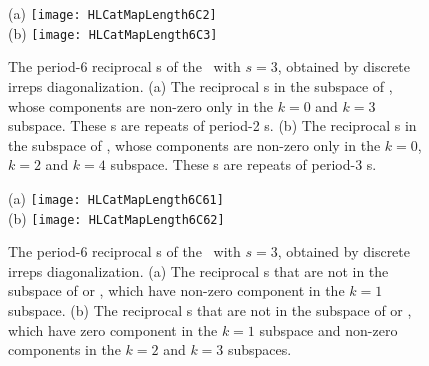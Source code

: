 \begin{description}
\begin{figure}
  \centering
{(a)} %
\texttt{[image: HLCatMapLength6C2]}
\\
{(b)} %
\texttt{[image: HLCatMapLength6C3]}
  \caption{\label{fig:HLCatMapLength6C2C3}
The period-6 reciprocal {\lattstate}s
of the \templatt\ with $s=3$, obtained by discrete  irreps
diagonalization.
(a)
The reciprocal {\lattstate}s in the subspace of , whose components
are non-zero only in the $k=0$ and $k=3$ subspace. These {\lattstate}s are repeats
of period-2 {\lattstate}s.
(b)
The reciprocal {\lattstate}s in the subspace of , whose components
are non-zero only in the $k=0$, $k=2$ and $k=4$ subspace. These {\lattstate}s are repeats
of period-3 {\lattstate}s.          }
\end{figure}

\begin{figure}
  \centering
{(a)} %
\texttt{[image: HLCatMapLength6C61]}
\\
{(b)} %
\texttt{[image: HLCatMapLength6C62]}
  \caption{\label{fig:HLCatMapLength6C6}
The period-6 reciprocal {\lattstate}s
of the \templatt\ with $s=3$, obtained by discrete  irreps
diagonalization.
(a)
The reciprocal {\lattstate}s that are not in the subspace of  or , which have non-zero
component in the $k=1$ subspace.
(b)
The reciprocal {\lattstate}s that are not in the subspace of  or , which have zero
component in the $k=1$ subspace and non-zero components in the $k=2$ and $k=3$
subspaces.
}
\end{figure}


\end{description}
